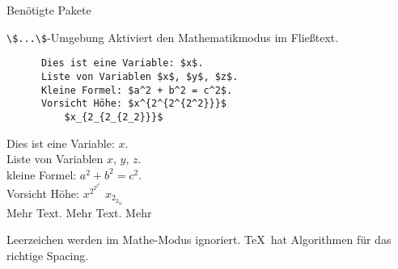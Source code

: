 \begin{frame}[fragile]{
  Benötigte Pakete
  \hfill{}
}
\end{frame}

\begin{frame}[fragile]{\lstinline+\$...\$+-Umgebung}
  Aktiviert den Mathematikmodus im Fließtext.

  \begin{CodeExample}{0.56}
    \begin{lstlisting}
      Dies ist eine Variable: $x$.
      Liste von Variablen $x$, $y$, $z$.
      Kleine Formel: $a^2 + b^2 = c^2$.
      Vorsicht Höhe: $x^{2^{2^{2^2}}}$
          $x_{2_{2_{2_2}}}$
    \end{lstlisting}
  \CodeResult
    Dies ist eine Variable: $x$. \\
    Liste von Variablen $x$, $y$, $z$. \\
    kleine Formel: $a^2 + b^2 = c^2$. \\
    Vorsicht Höhe: $x^{2^{2^{2^2}}}$ $x_{2_{2_{2_2}}}$ \\
    Mehr Text. Mehr Text. Mehr
  \end{CodeExample}

  \vspace{1em}
  Leerzeichen werden im Mathe-Modus ignoriert.
  \TeX\ hat Algorithmen für das richtige Spacing.
\end{frame}


